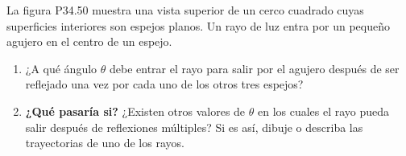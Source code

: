 \item La figura P34.50 muestra una vista superior de un cerco cuadrado cuyas superficies interiores son espejos planos. Un rayo de luz entra por un pequeño agujero en el centro de un espejo.
\begin{enumerate}
    \item ¿A qué ángulo $\theta$ debe entrar el rayo para salir por el agujero después de ser reflejado una vez por cada uno de los otros tres espejos?
    \item \textbf{¿Qué pasaría si?} ¿Existen otros valores de $\theta$ en los cuales el rayo pueda salir después de reflexiones múltiples? Si es así, dibuje o describa las trayectorias de uno de los rayos.
\end{enumerate}